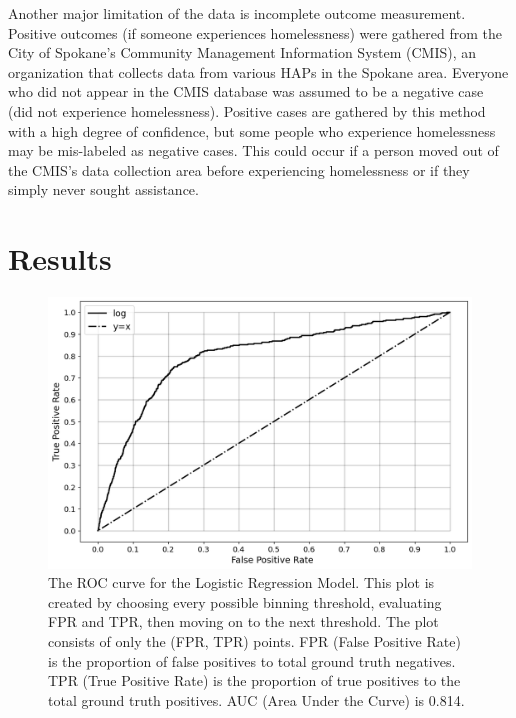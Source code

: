 \documentclass[10pt,letterpaper]{article}
\newcommand{\red}[1]{{\color{red}{#1}}}
\begin{document}
Another major limitation of the data is incomplete outcome measurement. Positive outcomes (if someone experiences homelessness) were gathered from the City of Spokane's Community Management Information System (CMIS), an organization that collects data from various HAPs in the Spokane area. Everyone who did not appear in the CMIS database was assumed to be a negative case (did not experience homelessness). Positive cases are gathered by this method with a high degree of confidence, but some people who experience homelessness may be mis-labeled as negative cases. This could occur if a person moved out of the CMIS's data collection area before experiencing homelessness or if they simply never sought assistance.

\section*{Results}

\begin{figure}[htb]
    \centering
    \includegraphics[width=\textwidth]{../img/ROC.png}
    \caption[ROC curve]{The ROC curve for the Logistic Regression Model. This plot is created by choosing every possible binning threshold, evaluating FPR and TPR, then moving on to the next threshold. The plot consists of only the (FPR, TPR) points. FPR (False Positive Rate) is the proportion of false positives to total ground truth negatives. TPR (True Positive Rate) is the proportion of true positives to the total ground truth positives. AUC (Area Under the Curve) is 0.814.}
    \label{fig:ROC}
\end{figure}
\red{REMOVE GRAPHICS BEFORE SUBMISSION}
\end{document}
